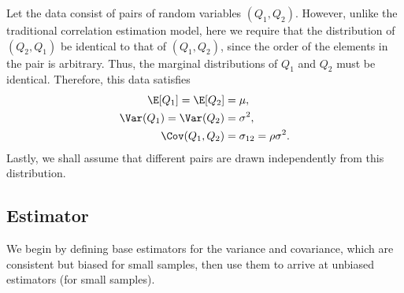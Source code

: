 \documentclass[11pt]{article}
\begin{document}
Let the data consist of pairs of random variables $(Q_1, Q_2)$.
However, unlike the traditional correlation estimation model, here we require that the distribution of $(Q_2, Q_1)$ be identical to that of $(Q_1, Q_2)$, since the order of the elements in the pair is arbitrary.
Thus, the marginal distributions of $Q_1$ and $Q_2$ must be identical.
Therefore, this data satisfies
\begin{align*}
  \E[ Q_1 ] = \E[ Q_2 ] &= \mu, \\
  \Var( Q_1 ) = \Var( Q_2 ) &= \sigma^2, \\
  \Cov( Q_1, Q_2 ) &= \sigma_{12} = \rho \sigma^2.
\end{align*}
Lastly, we shall assume that different pairs are drawn independently from this distribution.

\subsection{Estimator}

We begin by defining base estimators for the variance and covariance, which are consistent but biased for small samples, then use them to arrive at unbiased estimators (for small samples).
\end{document}
